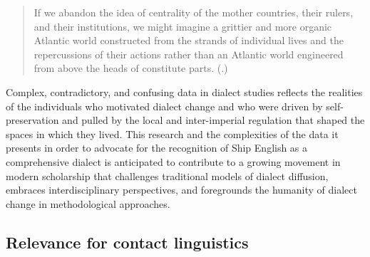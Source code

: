 \begin{quotation}
If we abandon the idea of centrality of the mother countries, their rulers, and their institutions, we might imagine a grittier and more organic Atlantic world constructed from the strands of individual lives and the repercussions of their actions rather than an Atlantic world engineered from above the heads of constitute parts. (\citealt{Daniels2015}.)\end{quotation}

Complex, contradictory, and confusing data in dialect studies reflects the realities of the individuals who motivated dialect change and who were driven by self-preservation and pulled by the local and inter-imperial regulation that shaped the spaces in which they lived. This research and the complexities of the data it presents in order to advocate for the recognition of Ship English as a comprehensive dialect is anticipated to contribute to a growing movement in modern scholarship that challenges traditional models of dialect diffusion, embraces interdisciplinary perspectives, and foregrounds the humanity of dialect change in methodological approaches. 

\subsection{\textbf{Relevance} \textbf{for} \textbf{contact} \textbf{linguistics}}%

